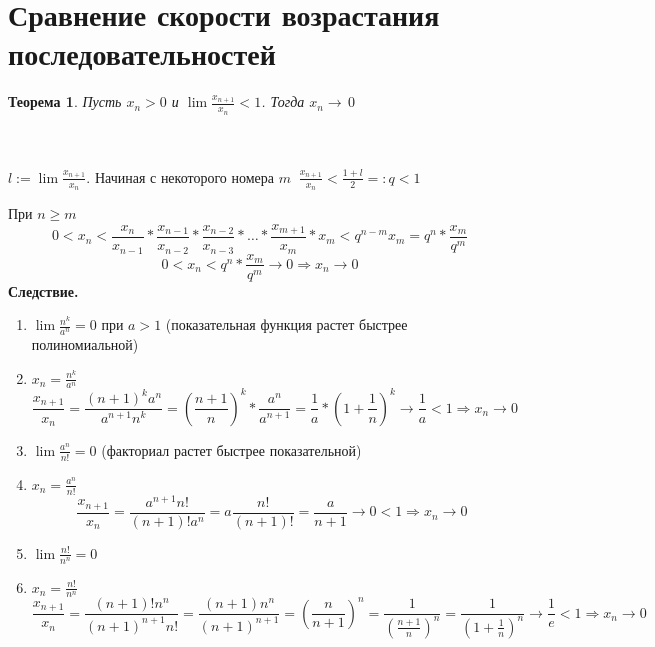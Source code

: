 \documentclass[12pt,letterpaper]{report}
\makeatletter
\newtheorem{theorem}{Теорема}
\renewenvironment{proof}[1][\proofname]{%
   \par\pushQED{\qed}\normalfont%
   \topsep6\p@\@plus6\p@\relax
   \trivlist\item[\hskip\labelsep\bfseries#1\@addpunct{.}]%
   \ignorespaces
}{%
   \popQED\endtrivlist\@endpefalse
}
\makeatother
\begin{document}
\section{Сравнение скорости возрастания последовательностей}
\begin{theorem}
    Пусть $x_n > 0$ и $\lim \frac{x_{n+1}}{x_n} < 1$. Тогда $x_n \to\,0$
\end{theorem}
\begin{proof} \quad \\\\
    $l := \lim \frac{x_{n+1}}{x_n}$. Начиная с некоторого номера $m \;\; \frac{x_{n+1}}{x_n} < \frac{1 + l}{2} =: q < 1$
    
    При $n \geqslant m$ 
    \[ 0 < x_n < \frac{x_n}{x_{n-1}} * \frac{x_{n-1}}{x_{n-2}} * \frac{x_{n-2}}{x_{n-3}} * \dots * \frac{x_{m+1}}{x_m} * x_m < q^{n-m}x_m = q^n * \frac{x_m}{q^m} \]
    \[ 0 < x_n < q^n * \frac{x_m}{q^m} \to 0 \Rightarrow x_n \to 0  \]
\end{proof}
\textbf{Следствие.}
\begin{enumerate}
    \item $\lim \frac{n^k}{a^n} = 0$ при $a > 1$ (показательная функция растет быстрее полиномиальной)
    \begin{proof}
        $x_n = \frac{n^k}{a^n}$
        \[ \frac{x_{n+1}}{x_n} =
        \frac{(n+1)^ka^n}{a^{n+1}n^k} = 
         (\frac{n+1}{n})^k * \frac{a^n}{a^{n+1}} = \frac{1}{a} * (1 + \frac{1}{n})^k \to \frac{1}{a} < 1 \Rightarrow x_n \to 0\]
    \end{proof}
    \item $\lim \frac{a^n}{n!} = 0$ (факториал растет быстрее показательной)
    \begin{proof}
        $x_n = \frac{a^n}{n!}$
        \[ \frac{x_{n+1}}{x_n} =  \frac{a^{n+1}n!}{(n+1)!a^n}
        = a\frac{n!}{(n+1)!} = \frac{a}{n+1} \to 0 < 1 \Rightarrow x_n \to 0 \]
    \end{proof}
    \item $\lim \frac{n!}{n^n} = 0$
    \begin{proof}
        $x_n = \frac{n!}{n^n}$
        \[ \frac{x_{n+1}}{x_n} = \frac{(n+1)!n^n}{(n+1)^{n+1}n!} = \frac{(n+1)n^n}{(n+1)^{n+1}} = (\frac{n}{n+1})^n = \frac{1}{(\frac{n + 1}{n})^n} = \frac{1}{(1 + \frac{1}{n})^n} \to \frac{1}{e} < 1 \Rightarrow x_n \to 0 \]
    \end{proof}
\end{enumerate}

\ifdefined\niveldos\else
\end{document}
